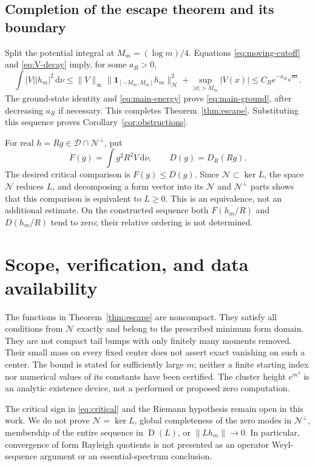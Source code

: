 \documentclass[11pt,a4paper]{article}
\newcommand{\HH}{\mathcal H}
\newcommand{\DD}{\mathcal D}
\newcommand{\NN}{\mathcal N}
\newcommand{\norm}[1]{\lVert #1\rVert}
\newcommand{\abs}[1]{\lvert #1\rvert}
\newcommand{\dd}{\,\mathrm d}
\newcommand{\Dom}{\operatorname{D}}
\theoremstyle{definition}
\theoremstyle{remark}
\numberwithin{equation}{section}
\begin{document}
\subsection{Completion of the escape theorem and its boundary}
Split the potential integral at $M_m=(\log m)/4$. Equations
\eqref{eq:moving-cutoff} and \eqref{eq:V-decay} imply, for some $a_R>0$,
\begin{equation}\label{eq:potential-small}
 \int\abs V\abs{h_m}^2\dd\nu
 \le \norm V_\infty\norm{\mathbf1_{[-M_m,M_m]}h_m}_{\HH}^2
       +\sup_{\abs x>M_m}\abs{V(x)}
 \le C_Re^{-a_R\sqrt m}.
\end{equation}
The ground-state identity and \eqref{eq:main-energy} prove
\eqref{eq:main-ground}, after decreasing $a_R$ if necessary. This completes
Theorem~\ref{thm:escape}. Substituting this sequence proves
Corollary~\ref{cor:obstructions}.

For real $h=Rg\in\DD\cap\NN^\perp$, put
\begin{equation}\label{eq:critical}
 F(g)=\int g^2R^2V\dd\nu,\qquad D(g)=D_R(Rg).
\end{equation}
The desired critical comparison is $F(g)\le D(g)$. Since
$\NN\subset\ker L$, the space $\NN$ reduces $L$, and decomposing a
form vector into its $\NN$ and $\NN^\perp$ parts shows that this
comparison is equivalent to $L\ge0$. This is an equivalence, not an
additional estimate. On the constructed sequence both $F(h_m/R)$ and
$D(h_m/R)$ tend to zero; their relative ordering is not determined.

\section{Scope, verification, and data availability}\label{sec:limits}

The functions in Theorem~\ref{thm:escape} are noncompact. They satisfy
all conditions from $\NN$ exactly and belong to the prescribed minimum
form domain. They are not compact tail bumps with only finitely many
moments removed. Their small mass on every fixed center does not assert
exact vanishing on such a center. The bound is stated for sufficiently
large $m$; neither a finite starting index nor numerical values of its
constants have been certified. The cluster height $e^{m^3}$ is an
analytic existence device, not a performed or proposed zero computation.

The critical sign in \eqref{eq:critical} and the Riemann hypothesis remain
open in this work. We do not prove $\NN=\ker L$, global completeness of
the zero modes in $\NN^\perp$, membership of the entire sequence in
$\Dom(L)$, or $\norm{Lh_m}\to0$. In particular, convergence of form
Rayleigh quotients is not presented as an operator Weyl-sequence argument
or an essential-spectrum conclusion.
\end{document}

